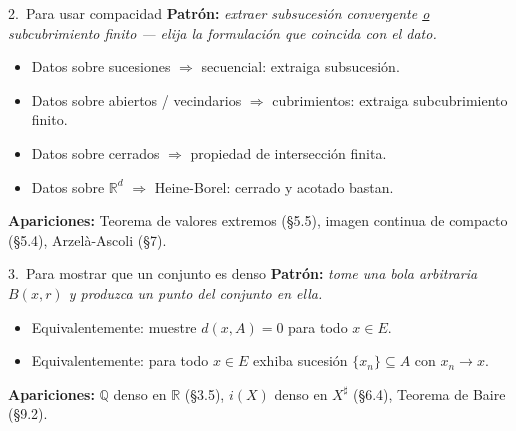 \documentclass[11pt,twoside]{article}
\newcommand{\R}{\mathbb{R}}
\newcommand{\Q}{\mathbb{Q}}
\begin{document}
\begin{strategybox}{2.\ Para usar compacidad}
\textbf{Patrón:} \textit{extraer subsucesión convergente \underline{o} subcubrimiento finito --- elija la formulación que coincida con el dato.}
\begin{itemize}[leftmargin=1.5em]
\item Datos sobre sucesiones $\Rightarrow$ secuencial: extraiga subsucesión.
\item Datos sobre abiertos / vecindarios $\Rightarrow$ cubrimientos: extraiga subcubrimiento finito.
\item Datos sobre cerrados $\Rightarrow$ propiedad de intersección finita.
\item Datos sobre $\R^{d}$ $\Rightarrow$ Heine-Borel: cerrado y acotado bastan.
\end{itemize}
\textbf{Apariciones:} Teorema de valores extremos (§5.5), imagen continua de compacto (§5.4), Arzelà-Ascoli (§7).
\end{strategybox}

\begin{strategybox}{3.\ Para mostrar que un conjunto es denso}
\textbf{Patrón:} \textit{tome una bola arbitraria $B(x, r)$ y produzca un punto del conjunto en ella.}
\begin{itemize}[leftmargin=1.5em]
\item Equivalentemente: muestre $d(x, A) = 0$ para todo $x \in E$.
\item Equivalentemente: para todo $x \in E$ exhiba sucesión $\{x_{n}\} \subseteq A$ con $x_{n} \to x$.
\end{itemize}
\textbf{Apariciones:} $\Q$ denso en $\R$ (§3.5), $i(X)$ denso en $X^{\sharp}$ (§6.4), Teorema de Baire (§9.2).
\end{strategybox}
\end{document}
